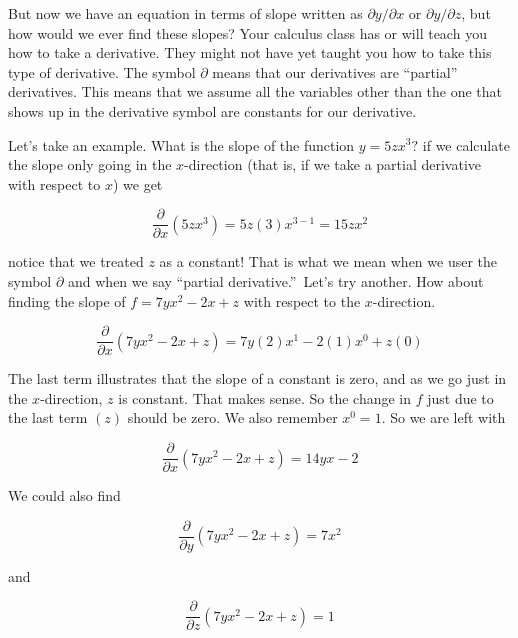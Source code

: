 But now we have an equation in terms of slope written as $\partial y/\partial x$ or $\partial y/\partial z$, but how would we ever find these slopes? Your calculus class has or will teach you how to take a derivative. They might not have yet taught you how to take this type of derivative. The symbol $\partial $ means that our derivatives are ``partial'' derivatives. This means that we assume all the variables other than the one that shows up in the derivative symbol are constants for our derivative.

Let's take an example. What is the slope of the function $y=5zx^{3}?$ if we calculate the slope only going in the $x$-direction (that is, if we take a partial derivative with respect to $x$) we get

\begin{equation*}
   \frac{\partial }{\partial x}\left( 5zx^{3}\right) =5z\left( 3\right) x^{3-1}=15zx^{2}
\end{equation*}

notice that we treated $z$ as a constant! That is what we mean when we user the symbol $\partial $ and when we say \textquotedblleft partial derivative.\textquotedblright\ Let's try another. How about finding the slope of $f=7yx^{2}-2x+z$ with respect to the $x$-direction.

\begin{equation*}
   \frac{\partial }{\partial x}\left( 7yx^{2}-2x+z\right) =7y\left( 2\right)x^{1}-2(1)x^{0}+z\left( 0\right)
\end{equation*}

The last term illustrates that the slope of a constant is zero, and as we go just in the $x$-direction, $z$ is constant. That makes sense. So the change in $f$ just due to the last term $(z)$ should be zero. We also remember $x^{0}=1.$ So we are left with 

\begin{equation*}
	\frac{\partial }{\partial x}\left( 7yx^{2}-2x+z\right) =14yx-2
\end{equation*}

We could also find 

\begin{equation*}
	\frac{\partial }{\partial y}\left( 7yx^{2}-2x+z\right) =7x^{2}
\end{equation*}

and

\begin{equation*}
	\frac{\partial }{\partial z}\left( 7yx^{2}-2x+z\right) =1
\end{equation*}

